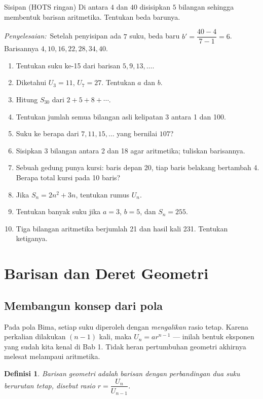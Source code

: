 \documentclass[11pt,a4paper]{report}
\theoremstyle{gaya}
\newtheorem{definisi}{Definisi}[chapter]
\newcommand{\jawab}{\par\smallskip\noindent\textit{\textcolor{oranye}{Penyelesaian:}}\ }
\begin{document}
\begin{contoh}{Sisipan (HOTS ringan)}
Di antara $4$ dan $40$ disisipkan $5$ bilangan sehingga membentuk barisan aritmetika. Tentukan beda barunya.

\jawab Setelah penyisipan ada $7$ suku, beda baru $b'=\dfrac{40-4}{7-1}=6$. Barisannya $4,10,16,22,28,34,40$.
\end{contoh}

\begin{latihan}
\begin{enumerate}[leftmargin=*]
  \item Tentukan suku ke-15 dari barisan $5, 9, 13, \dots$.
  \item Diketahui $U_3=11$, $U_7=27$. Tentukan $a$ dan $b$.
  \item Hitung $S_{30}$ dari $2+5+8+\cdots$.
  \item Tentukan jumlah semua bilangan asli kelipatan 3 antara 1 dan 100.
  \item Suku ke berapa dari $7,11,15,\dots$ yang bernilai $107$?
  \item Sisipkan 3 bilangan antara 2 dan 18 agar aritmetika; tuliskan barisannya.
  \item Sebuah gedung punya kursi: baris depan 20, tiap baris belakang bertambah 4. Berapa total kursi pada 10 baris?
  \item Jika $S_n=2n^2+3n$, tentukan rumus $U_n$.
  \item Tentukan banyak suku jika $a=3$, $b=5$, dan $S_n=255$.
  \item Tiga bilangan aritmetika berjumlah 21 dan hasil kali 231. Tentukan ketiganya.
\end{enumerate}
\end{latihan}

\section{Barisan dan Deret Geometri}

\subsection*{Membangun konsep dari pola}
Pada pola Bima, setiap suku diperoleh dengan \emph{mengalikan} rasio tetap. Karena perkalian dilakukan $(n-1)$ kali, maka $U_n=ar^{n-1}$ --- inilah bentuk eksponen yang sudah kita kenal di Bab 1. Tidak heran pertumbuhan geometri akhirnya melesat melampaui aritmetika.

\begin{definisi}
\emph{Barisan geometri} adalah barisan dengan perbandingan dua suku berurutan tetap, disebut \emph{rasio} $r = \dfrac{U_n}{U_{n-1}}$.
\end{definisi}
\end{document}
